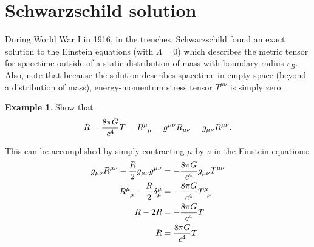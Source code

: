 \documentclass{book}
\theoremstyle{definition}
\newtheorem{exmp}{Example}[section]
\begin{document}
\section{Schwarzschild solution}
During World War I in 1916, in the trenches, Schwarzschild found an exact solution to the Einstein equations (with $\Lambda = 0$) which describes the metric tensor for spacetime outside of a static distribution of mass with boundary radius $r_B$. Also, note that because the solution describes spacetime in empty space (beyond a distribution of mass), energy-momentum stress tensor $T^{\mu\nu}$ is simply zero.\\

\begin{exmp}
	Show that
	\begin{align*}
	R = \frac{8\pi G}{c^4}T = \tensor{R}{^\mu_\mu} = g^{\mu\nu}R_{\mu\nu} = g_{\mu\nu}R^{\mu\nu}.
	\end{align*}
	
	This can be accomplished by simply contracting $\mu$ by $\nu$ in the Einstein equations:
	\begin{align*}
	g_{\mu\nu}R^{\mu\nu} - \frac{R}{2}g_{\mu\nu}g^{\mu\nu} &= -\frac{8\pi G}{c^4}g_{\mu\nu}T^{\mu\nu}\\
	\tensor{R}{^\mu_\mu} - \frac{R}{2}\delta^{\mu}_{\mu} &= -\frac{8\pi G}{c^4}\tensor{T}{^\mu_\mu}\\
	R - 2R &= -\frac{8\pi G}{c^4}T\\
	R &= \frac{8\pi G}{c^4}T
	\end{align*}
\end{exmp}
\end{document}
